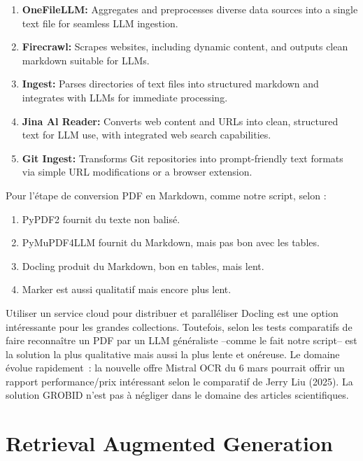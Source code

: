 \documentclass[a4paper,11pt]{report}
\providecommand{\tightlist}{\setlength{\itemsep}{0pt}\setlength{\parskip}{0pt}}
\begin{document}
\begin{enumerate}
\def\labelenumi{\arabic{enumi}.}
\tightlist
\item
  \textbf{\textbf{OneFileLLM:}} Aggregates and preprocesses diverse data sources into a single text file for seamless LLM ingestion.
\item
  \textbf{\textbf{Firecrawl:}} Scrapes websites, including dynamic content, and outputs clean markdown suitable for LLMs.
\item
  \textbf{\textbf{Ingest:}} Parses directories of text files into structured markdown and integrates with LLMs for immediate processing.
\item
  \textbf{\textbf{Jina Al Reader:}} Converts web content and URLs into clean, structured text for LLM use, with integrated web search capabilities.
\item
  \textbf{Git Ingest:} Transforms Git repositories into prompt-friendly text formats via simple URL modifications or a browser extension.
\end{enumerate}

Pour l'étape de conversion PDF en Markdown, comme notre script, selon \citep{ULQGRISS}:

\begin{enumerate}
\def\labelenumi{\arabic{enumi}.}
\tightlist
\item
  PyPDF2 fournit du texte non balisé.
\item
  PyMuPDF4LLM fournit du Markdown, mais pas bon avec les tables.
\item
  Docling produit du Markdown, bon en tables, mais lent.
\item
  Marker est aussi qualitatif mais encore plus lent.
\end{enumerate}

Utiliser un service cloud pour distribuer et paralléliser Docling est une option intéressante pour les grandes collections. Toutefois, selon les tests comparatifs de \citep{RM4KCTEG} faire reconnaître un PDF par un LLM généraliste --comme le fait notre script-- est la solution la plus qualitative mais aussi la plus lente et onéreuse. Le domaine évolue rapidement~: la nouvelle offre Mistral OCR du 6 mars pourrait offrir un rapport performance/prix intéressant selon le comparatif de Jerry Liu (2025). La solution GROBID n'est pas à négliger dans le domaine des articles scientifiques.

\chapter{Retrieval Augmented Generation}\label{retrieval-augmented-generation}
\end{document}
